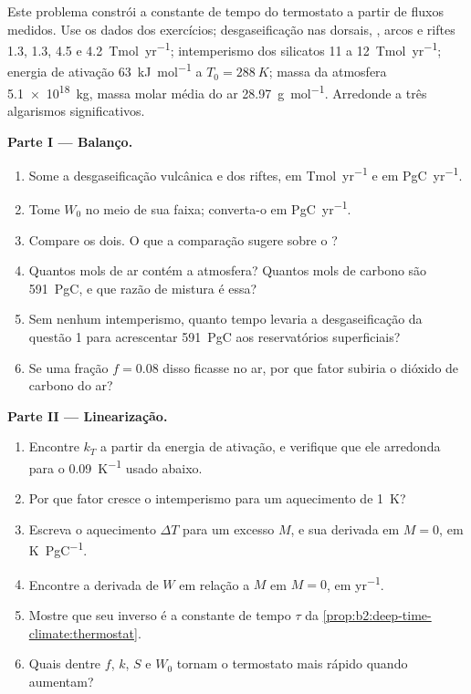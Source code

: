 \begin{problem}\label{pb:b2:deep-time-climate:1}
Este problema constrói a constante de tempo do termostato a partir de fluxos medidos. Use os dados dos
exercícios; desgaseificação nas dorsais, , arcos e riftes \num{1.3}, \num{1.3}, 4.5 e
\qty{4.2}{Tmol.yr^{-1}}; intemperismo dos silicatos 11 a \qty{12}{Tmol.yr^{-1}}; energia de ativação
\qty{63}{kJ.mol^{-1}} a $T_0 = \qty{288}{K}$; massa da atmosfera \qty{5.1e18}{kg}, massa molar média
do ar \qty{28.97}{g.mol^{-1}}. Arredonde a três algarismos significativos.

\noindent\textbf{Parte I --- Balanço.}
\begin{enumerate}
  \item Some a desgaseificação vulcânica e dos riftes, em \unit{Tmol.yr^{-1}} e em \unit{PgC.yr^{-1}}.
  \item Tome $W_0$ no meio de sua faixa; converta-o em \unit{PgC.yr^{-1}}.
  \item Compare os dois. O que a comparação sugere sobre o ?
  \item Quantos mols de ar contém a atmosfera? Quantos mols de carbono são \qty{591}{PgC},
        e que razão de mistura é essa?
  \item Sem nenhum intemperismo, quanto tempo levaria a desgaseificação da questão 1 para acrescentar
        \qty{591}{PgC} aos reservatórios superficiais?
  \item Se uma fração $f = 0.08$ disso ficasse no ar, por que fator subiria o dióxido de carbono
        do ar?
\end{enumerate}

\noindent\textbf{Parte II --- Linearização.}
\begin{enumerate}[resume]
  \item Encontre $k_T$ a partir da energia de ativação, e verifique que ele arredonda para o
        \qty{0.09}{K^{-1}} usado abaixo.
  \item Por que fator cresce o intemperismo para um aquecimento de \qty{1}{K}?
  \item Escreva o aquecimento $\Delta T$ para um excesso $M$, e sua derivada em $M = 0$, em
        \unit{K.PgC^{-1}}.
  \item Encontre a derivada de $W$ em relação a $M$ em $M = 0$, em \unit{yr^{-1}}.
  \item Mostre que seu inverso é a constante de tempo $\tau$ da
        \cref{prop:b2:deep-time-climate:thermostat}.
  \item Quais dentre $f$, $k$, $S$ e $W_0$ tornam o termostato mais rápido quando aumentam?
\end{enumerate}


\end{problem}
